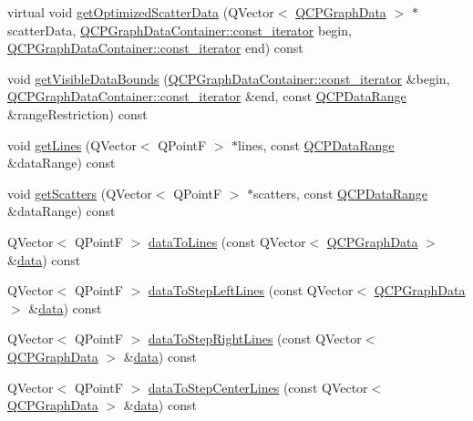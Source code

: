 \begin{DoxyCompactItemize}
virtual void \hyperlink{class_q_c_p_graph_af9f0c50d187fb6bc8a5164985460a894}{get\+Optimized\+Scatter\+Data} (Q\+Vector$<$ \hyperlink{class_q_c_p_graph_data}{Q\+C\+P\+Graph\+Data} $>$ $\ast$scatter\+Data, \hyperlink{class_q_c_p_data_container_ae40a91f5cb0bcac61d727427449b7d15}{Q\+C\+P\+Graph\+Data\+Container\+::const\+\_\+iterator} begin, \hyperlink{class_q_c_p_data_container_ae40a91f5cb0bcac61d727427449b7d15}{Q\+C\+P\+Graph\+Data\+Container\+::const\+\_\+iterator} end) const 
\item 
void \hyperlink{class_q_c_p_graph_a687d370a9fbe8d4345dd6387870a198d}{get\+Visible\+Data\+Bounds} (\hyperlink{class_q_c_p_data_container_ae40a91f5cb0bcac61d727427449b7d15}{Q\+C\+P\+Graph\+Data\+Container\+::const\+\_\+iterator} \&begin, \hyperlink{class_q_c_p_data_container_ae40a91f5cb0bcac61d727427449b7d15}{Q\+C\+P\+Graph\+Data\+Container\+::const\+\_\+iterator} \&end, const \hyperlink{class_q_c_p_data_range}{Q\+C\+P\+Data\+Range} \&range\+Restriction) const 
\item 
void \hyperlink{class_q_c_p_graph_a4827cc8402023cceec56bc2e59915565}{get\+Lines} (Q\+Vector$<$ Q\+PointF $>$ $\ast$lines, const \hyperlink{class_q_c_p_data_range}{Q\+C\+P\+Data\+Range} \&data\+Range) const 
\item 
void \hyperlink{class_q_c_p_graph_affcf992b16846f43f55500c910d197c8}{get\+Scatters} (Q\+Vector$<$ Q\+PointF $>$ $\ast$scatters, const \hyperlink{class_q_c_p_data_range}{Q\+C\+P\+Data\+Range} \&data\+Range) const 
\item 
Q\+Vector$<$ Q\+PointF $>$ \hyperlink{class_q_c_p_graph_ad3d0a20bcf390698f6b14e3dc20a4c33}{data\+To\+Lines} (const Q\+Vector$<$ \hyperlink{class_q_c_p_graph_data}{Q\+C\+P\+Graph\+Data} $>$ \&\hyperlink{class_q_c_p_graph_a04514a2b1fb61a280ead66abe80b89ab}{data}) const 
\item 
Q\+Vector$<$ Q\+PointF $>$ \hyperlink{class_q_c_p_graph_a64423430763ee0ce7b3b3274e4df3e56}{data\+To\+Step\+Left\+Lines} (const Q\+Vector$<$ \hyperlink{class_q_c_p_graph_data}{Q\+C\+P\+Graph\+Data} $>$ \&\hyperlink{class_q_c_p_graph_a04514a2b1fb61a280ead66abe80b89ab}{data}) const 
\item 
Q\+Vector$<$ Q\+PointF $>$ \hyperlink{class_q_c_p_graph_a194ad6590b465a6ac6d393b492798a6f}{data\+To\+Step\+Right\+Lines} (const Q\+Vector$<$ \hyperlink{class_q_c_p_graph_data}{Q\+C\+P\+Graph\+Data} $>$ \&\hyperlink{class_q_c_p_graph_a04514a2b1fb61a280ead66abe80b89ab}{data}) const 
\item 
Q\+Vector$<$ Q\+PointF $>$ \hyperlink{class_q_c_p_graph_a2ad792d49fc4b613c1fc05544f530ef8}{data\+To\+Step\+Center\+Lines} (const Q\+Vector$<$ \hyperlink{class_q_c_p_graph_data}{Q\+C\+P\+Graph\+Data} $>$ \&\hyperlink{class_q_c_p_graph_a04514a2b1fb61a280ead66abe80b89ab}{data}) const 

\end{DoxyCompactItemize}
